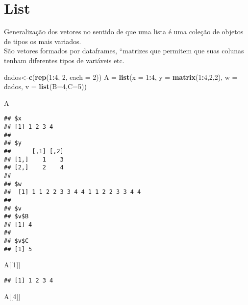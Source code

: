 \documentclass[]{article}
\newenvironment{Shaded}{\begin{snugshade}}{\end{snugshade}}
\newcommand{\KeywordTok}[1]{\textcolor[rgb]{0.13,0.29,0.53}{\textbf{#1}}}
\newcommand{\DataTypeTok}[1]{\textcolor[rgb]{0.13,0.29,0.53}{#1}}
\newcommand{\DecValTok}[1]{\textcolor[rgb]{0.00,0.00,0.81}{#1}}
\newcommand{\StringTok}[1]{\textcolor[rgb]{0.31,0.60,0.02}{#1}}
\newcommand{\OperatorTok}[1]{\textcolor[rgb]{0.81,0.36,0.00}{\textbf{#1}}}
\newcommand{\NormalTok}[1]{#1}
\begin{document}
\section{List}\label{list}

Generalização dos vetores no sentido de que uma lista é uma coleção de
objetos de tipos os mais variados.\\
São vetores formados por dataframes, ``matrizes que permitem que suas
colunas tenham diferentes tipos de variáveis etc.

\begin{Shaded}
\begin{Highlighting}[]
\NormalTok{dados<-}\KeywordTok{c}\NormalTok{(}\KeywordTok{rep}\NormalTok{(}\DecValTok{1}\OperatorTok{:}\DecValTok{4}\NormalTok{, }\DecValTok{2}\NormalTok{, }\DataTypeTok{each =} \DecValTok{2}\NormalTok{))}
\NormalTok{A =}\StringTok{ }\KeywordTok{list}\NormalTok{(}\DataTypeTok{x =} \DecValTok{1}\OperatorTok{:}\DecValTok{4}\NormalTok{, }\DataTypeTok{y =} \KeywordTok{matrix}\NormalTok{(}\DecValTok{1}\OperatorTok{:}\DecValTok{4}\NormalTok{,}\DecValTok{2}\NormalTok{,}\DecValTok{2}\NormalTok{), }\DataTypeTok{w =}\NormalTok{ dados, }\DataTypeTok{v =} \KeywordTok{list}\NormalTok{(}\DataTypeTok{B=}\DecValTok{4}\NormalTok{,}\DataTypeTok{C=}\DecValTok{5}\NormalTok{))}

\NormalTok{A}
\end{Highlighting}
\end{Shaded}

\begin{verbatim}
## $x
## [1] 1 2 3 4
## 
## $y
##      [,1] [,2]
## [1,]    1    3
## [2,]    2    4
## 
## $w
##  [1] 1 1 2 2 3 3 4 4 1 1 2 2 3 3 4 4
## 
## $v
## $v$B
## [1] 4
## 
## $v$C
## [1] 5
\end{verbatim}

\begin{Shaded}
\begin{Highlighting}[]
\NormalTok{A[[}\DecValTok{1}\NormalTok{]]}
\end{Highlighting}
\end{Shaded}

\begin{verbatim}
## [1] 1 2 3 4
\end{verbatim}

\begin{Shaded}
\begin{Highlighting}[]
\NormalTok{A[[}\DecValTok{4}\NormalTok{]]}
\end{Highlighting}
\end{Shaded}
\end{document}
